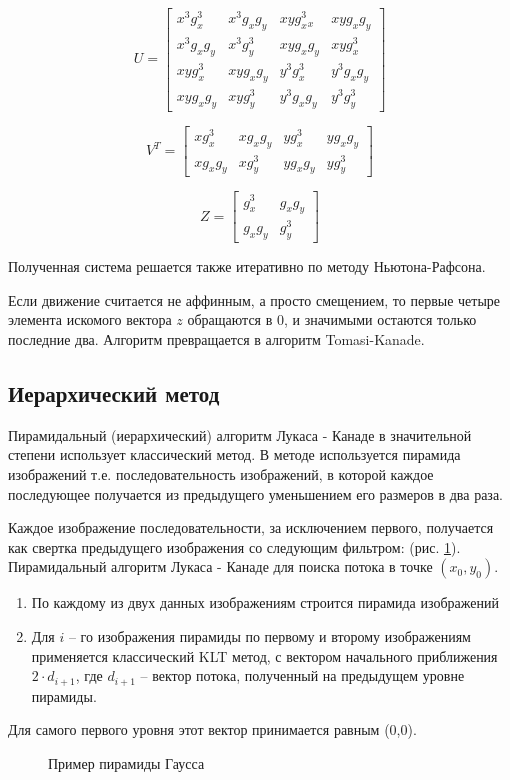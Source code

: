 $$U=\begin{bmatrix}
x^3g^3_x & x^3g_xg_y & xyg^3_x_x & xyg_xg_y \\
x^3g_xg_y & x^3g^3_y & xyg_xg_y & xyg^3_x \\
xyg^3_x & xyg_xg_y & y^3g^3_x & y^3g_xg_y \\
xyg_xg_y & xyg^3_y & y^3g_xg_y & y^3g^3_y
\end{bmatrix}$$

$$V^T=\begin{bmatrix}
xg^3_x & xg_xg_y & yg^3_x & yg_xg_y \\
xg_xg_y & xg^3_y & yg_xg_y & yg^3_y
\end{bmatrix}$$

$$Z=\begin{bmatrix}
g^3_x & g_xg_y \\
g_xg_y & g^3_y
\end{bmatrix}$$

Полученная система решается также итеративно по методу Ньютона-Рафсона.

Если движение считается не аффинным, а просто смещением, то первые четыре элемента искомого вектора $z$ обращаются в 0, и значимыми остаются только последние два. Алгоритм превращается в алгоритм Tomasi-Kanade.

\subsection{Иерархический метод}
Пирамидальный (иерархический) алгоритм Лукаса - Канаде в значительной степени использует классический метод. В методе используется пирамида изображений т.е. последовательность изображений, в которой каждое последующее получается из предыдущего уменьшением его размеров в два раза.

Каждое изображение последовательности, за исключением первого, получается как свертка предыдущего изображения со следующим фильтром:
(рис. \ref{pic:pyramid}).
Пирамидальный алгоритм Лукаса - Канаде для поиска потока в точке $(x_0,y_0)$.
\begin{enumerate}
\item По каждому из двух данных изображениям строится пирамида изображений
\item Для $i$ – го изображения пирамиды по первому и второму изображениям применяется классический KLT метод, с вектором начального приближения $2 \cdot d_{i+1}$, где $d_{i+1}$ – вектор потока, полученный на предыдущем уровне пирамиды.
\end{enumerate}
Для самого первого уровня этот вектор принимается равным (0,0).


\begin{figure}[ht]
\caption{Пример пирамиды Гаусса}
\label{pic:pyramid}
\end{figure}
